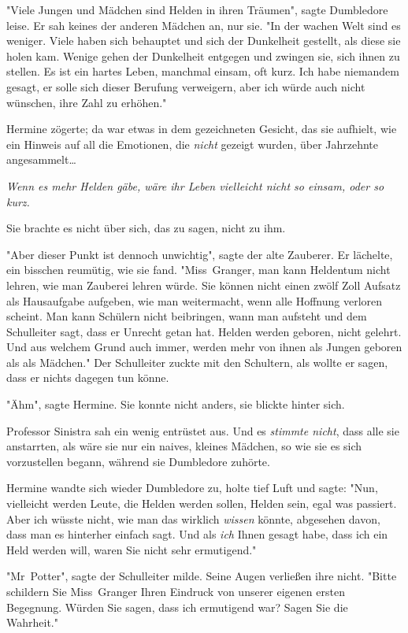 {"Viele Jungen und Mädchen sind Helden in ihren Träumen", sagte Dumbledore leise. Er sah keines der anderen Mädchen an, nur sie. "In der wachen Welt sind es weniger. Viele haben sich behauptet und sich der Dunkelheit gestellt, als diese sie holen kam. Wenige gehen der Dunkelheit entgegen und zwingen sie, sich ihnen zu stellen. Es ist ein hartes Leben, manchmal einsam, oft kurz. Ich habe niemandem gesagt, er solle sich dieser Berufung verweigern, aber ich würde auch nicht wünschen, ihre Zahl zu erhöhen."

Hermine zögerte; da war etwas in dem gezeichneten Gesicht, das sie aufhielt, wie ein Hinweis auf all die Emotionen, die \emph{nicht} gezeigt wurden, über Jahrzehnte angesammelt…

\emph{\emph{Wenn es mehr Helden gäbe, wäre ihr Leben vielleicht nicht so einsam, oder so} \emph{kurz.}}

Sie brachte es nicht über sich, das zu sagen, nicht zu ihm.

"Aber dieser Punkt ist dennoch unwichtig", sagte der alte Zauberer. Er lächelte, ein bisschen reumütig, wie sie fand. "Miss~Granger, man kann Heldentum nicht lehren, wie man Zauberei lehren würde. Sie können nicht einen zwölf Zoll Aufsatz als Hausaufgabe aufgeben, wie man weitermacht, wenn alle Hoffnung verloren scheint. Man kann Schülern nicht beibringen, wann man aufsteht und dem Schulleiter sagt, dass er Unrecht getan hat. Helden werden geboren, nicht gelehrt. Und aus welchem Grund auch immer, werden mehr von ihnen als Jungen geboren als als Mädchen." Der Schulleiter zuckte mit den Schultern, als wollte er sagen, dass er nichts dagegen tun könne.

"Ähm", sagte Hermine. Sie konnte nicht anders, sie blickte hinter sich.

Professor Sinistra sah ein wenig entrüstet aus. Und es \emph{stimmte nicht}, dass alle sie anstarrten, als wäre sie nur ein naives, kleines Mädchen, so wie sie es sich vorzustellen begann, während sie Dumbledore zuhörte.

Hermine wandte sich wieder Dumbledore zu, holte tief Luft und sagte: "Nun, vielleicht werden Leute, die Helden werden sollen, Helden sein, egal was passiert. Aber ich wüsste nicht, wie man das wirklich \emph{wissen} könnte, abgesehen davon, dass man es hinterher einfach sagt. Und als \emph{ich} Ihnen gesagt habe, dass ich ein Held werden will, waren Sie nicht sehr ermutigend."

"Mr~Potter", sagte der Schulleiter milde. Seine Augen verließen ihre nicht. "Bitte schildern Sie Miss~Granger Ihren Eindruck von unserer eigenen ersten Begegnung. Würden Sie sagen, dass ich ermutigend war? Sagen Sie die Wahrheit."

}
